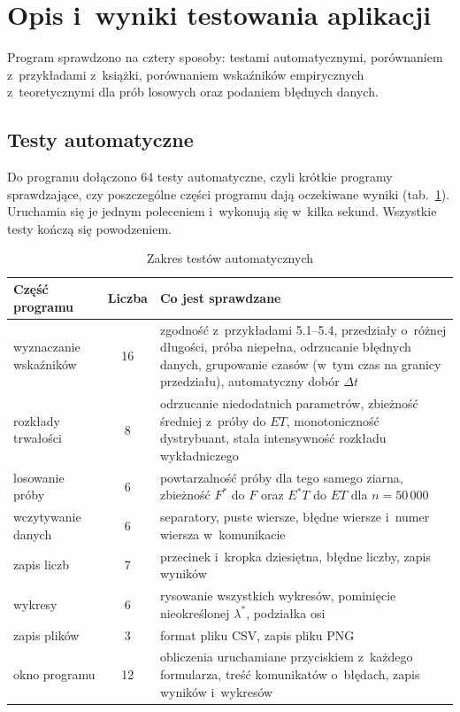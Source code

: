 \section{Opis i~wyniki testowania aplikacji}

Program sprawdzono na cztery sposoby: testami automatycznymi, porównaniem z~przykładami
z~książki, porównaniem wskaźników empirycznych z~teoretycznymi dla prób losowych oraz
podaniem błędnych danych.

\subsection{Testy automatyczne}

Do programu dołączono 64 testy automatyczne, czyli krótkie programy sprawdzające, czy
poszczególne części programu dają oczekiwane wyniki (tab.~\ref{tab:tests}). Uruchamia
się je jednym poleceniem i~wykonują się w~kilka sekund. Wszystkie testy kończą się
powodzeniem.

\begin{table}[H]
  \centering
  \caption{Zakres testów automatycznych}
  \label{tab:tests}
  \small
  \begin{tabular}{@{}>{\raggedright\arraybackslash}p{}c>{\raggedright\arraybackslash}p{}@{}}
    \toprule
    Część programu & Liczba & Co jest sprawdzane \\
    \midrule
    wyznaczanie wskaźników & 16 & zgodność z~przykładami 5.1--5.4, przedziały o~różnej
      długości, próba niepełna, odrzucanie błędnych danych, grupowanie czasów (w~tym czas
      na granicy przedziału), automatyczny dobór $\Delta t$ \\
    rozkłady trwałości & 8 & odrzucanie niedodatnich parametrów, zbieżność średniej
      z~próby do $ET$, monotoniczność dystrybuant, stała intensywność rozkładu
      wykładniczego \\
    losowanie próby & 6 & powtarzalność próby dla tego samego ziarna, zbieżność $F^*$
      do $F$ oraz $E^*T$ do $ET$ dla $n = 50\,000$ \\
    wczytywanie danych & 6 & separatory, puste wiersze, błędne wiersze i~numer wiersza
      w~komunikacie \\
    zapis liczb & 7 & przecinek i~kropka dziesiętna, błędne liczby, zapis wyników \\
    wykresy & 6 & rysowanie wszystkich wykresów, pominięcie nieokreślonej $\lambda^*$,
      podziałka osi \\
    zapis plików & 3 & format pliku CSV, zapis pliku PNG \\
    okno programu & 12 & obliczenia uruchamiane przyciskiem z~każdego formularza, treść
      komunikatów o~błędach, zapis wyników i~wykresów \\
    \bottomrule
  \end{tabular}
\end{table}

